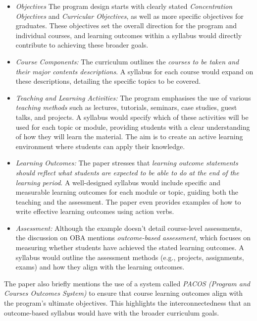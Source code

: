 \documentclass[11pt,a4paper]{article}
\begin{document}
	\begin{itemize} 
	\item \emph{Objectives} The program design starts with clearly stated \emph{Concentration Objectives} and \emph{Curricular Objectives}, as well as more specific objectives for graduates. These objectives set the overall direction for the program and individual courses, and learning outcomes within a syllabus would directly contribute to achieving these broader goals.
	
	\item \emph{Course Components:} The curriculum outlines the \emph{courses to be taken and their major contents descriptions}. A syllabus for each course would expand on these descriptions, detailing the specific topics to be covered.
	
	\item \emph{Teaching and Learning Activities:} The program emphasises the use of various \emph{teaching methods} such as lectures, tutorials, seminars, case studies, guest talks, and projects. A syllabus would specify which of these activities will be used for each topic or module, providing students with a clear understanding of how they will learn the material. The aim is to create an active learning environment where students can apply their knowledge.
	
	\item \emph{Learning Outcomes:} The paper stresses that \emph{learning outcome statements should reflect what students are expected to be able to do at the end of the learning period}. A well-designed syllabus would include specific and measurable learning outcomes for each module or topic, guiding both the teaching and the assessment. The paper even provides examples of how to write effective learning outcomes using action verbs.
	
	\item \emph{Assessment:} Although the example doesn't detail course-level assessments, the discussion on OBA mentions \emph{outcome-based assessment}, which focuses on measuring whether students have achieved the stated learning outcomes. A syllabus would outline the assessment methods (e.g., projects, assignments, exams) and how they align with the learning outcomes.
	
	\end{itemize}
	
	The paper also briefly mentions the use of a system called \emph{PACOS (Program and Courses Outcomes System)} to ensure that course learning outcomes align with the program's ultimate objectives. This highlights the interconnectedness that an outcome-based syllabus would have with the broader curriculum goals.
	
\end{document}
